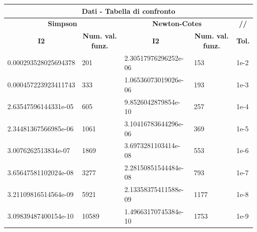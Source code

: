 \documentclass[10pt,a4paper]{article}
\begin{document}
 \begin{center}
  \setlength\tabcolsep{2pt}
  \begin{tabular}{|p{3.6cm} | p{1cm} | p{3.6cm} | p{1cm} | p{1cm}|}
    \hline
    \multicolumn{5}{|c|}{\textbf{Dati - Tabella di confronto}}  \\                                                                                                                                 
    \hline
    \multicolumn{2}{|c|}{\textbf{Simpson}} & \multicolumn{2}{|c|}{\textbf{Newton-Cotes}} & \multicolumn{1}{c|}{\textbf{//}} \\                                                                           
    \hline
    \multicolumn{1}{|c|}{\textbf{I2}} & \multicolumn{1}{|c|}{\textbf{Num. val. funz.}} & \multicolumn{1}{|c|}{\textbf{I2}} &
     \multicolumn{1}{|c|}{\textbf{Num. val. funz.}}  & \multicolumn{1}{|c|}{\textbf{Tol.}} \\
    \hline
    0.000293528025694378 & 201 & 2.30517976296252e-06 & 153 & 1e-2 \\
    0.000457223923411743 & 333 & 1.06536073019026e-06 & 193 & 1e-3 \\
    2.63547596144331e-05 & 605 & 9.8526042879854e-10 & 257 & 1e-4 \\
    2.34481367566985e-06 & 1061 & 3.10416783644296e-06 & 369 & 1e-5 \\
    3.0076262513834e-07 & 1869 & 3.6973281103414e-08 & 553 & 1e-6 \\
    3.65647581102024e-08 & 3277 & 2.28150851544484e-08 & 793 & 1e-7 \\
    3.21109816514564e-09 & 5921 & 2.13358375411588e-09 & 1177 & 1e-8 \\
    3.09839487400154e-10 & 10589 & 1.49663170745384e-10 & 1753 & 1e-9 \\
    \hline
\end{tabular}
\end{center}
\end{document}
